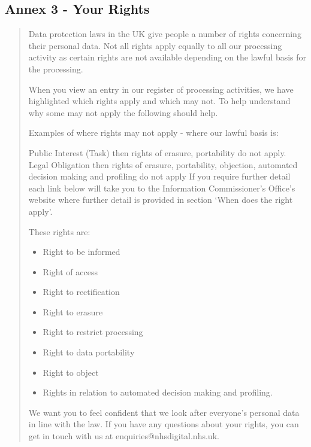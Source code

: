 \documentclass[twocolumn, letterpaper,13pt]{scrartcl}
\begin{document}
    \subsection*{Annex 3 - Your Rights}
    \begin{quote}
        Data protection laws in the UK give people a number of rights concerning their personal data. Not all rights apply equally to all our processing activity as certain rights are not available depending on the lawful basis for the processing.
        
        When you view an entry in our register of processing activities, we have highlighted which rights apply and which may not. To help understand why some may not apply the following should help.
        
        Examples of where rights may not apply - where our lawful basis is:
        
        Public Interest (Task) then rights of erasure, portability do not apply.
        Legal Obligation then rights of erasure, portability, objection, automated decision making and profiling do not apply
        If you require further detail each link below will take you to the Information Commissioner’s Office’s website where further detail is provided in section ‘When does the right apply’.
        
        These rights are:
        \begin{itemize}
            \item Right to be informed
            \item Right of access
            \item Right to rectification
            \item Right to erasure
            \item Right to restrict processing
            \item Right to data portability
            \item Right to object
            \item Rights in relation to automated decision making and profiling.
        \end{itemize}
        
        We want you to feel confident that we look after everyone’s personal data in line with the law. If you have any questions about your rights, you can get in touch with us at enquiries@nhsdigital.nhs.uk.
    \end{quote}
\end{document}
